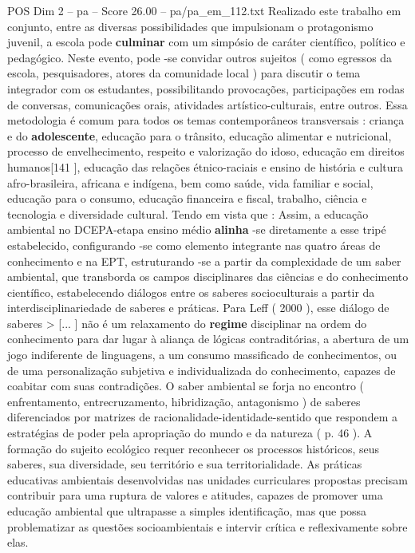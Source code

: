 \begin{textsample}{POS Dim 2 – pa – Score 26.00 – pa/pa\_em\_112.txt}  \label{ex:f2_pos_068}
Realizado este trabalho em conjunto, entre as diversas possibilidades que impulsionam o protagonismo juvenil, a escola pode \textbf{culminar} com um simpósio de caráter científico, político e pedagógico.
Neste evento, pode -se convidar outros sujeitos ( como egressos da escola, pesquisadores, atores da comunidade local ) para discutir o tema integrador com os estudantes, possibilitando provocações, participações em rodas de conversas, comunicações orais, atividades artístico-culturais, entre outros.
Essa metodologia é comum para todos os temas contemporâneos transversais : criança e do \textbf{adolescente}, educação para o trânsito, educação alimentar e nutricional, processo de envelhecimento, respeito e valorização do idoso, educação em direitos humanos[141 ], educação das relações étnico-raciais e ensino de história e cultura afro-brasileira, africana e indígena, bem como saúde, vida familiar e social, educação para o consumo, educação financeira e fiscal, trabalho, ciência e tecnologia e diversidade cultural.
Tendo em vista que : Assim, a educação ambiental no DCEPA-etapa ensino médio \textbf{alinha} -se diretamente a esse tripé estabelecido, configurando -se como elemento integrante nas quatro áreas de conhecimento e na EPT, estruturando -se a partir da complexidade de um saber ambiental, que transborda os campos disciplinares das ciências e do conhecimento científico, estabelecendo diálogos entre os saberes socioculturais a partir da interdisciplinariedade de saberes e práticas.
Para Leff ( 2000 ), esse diálogo de saberes > [... ] não é um relaxamento do \textbf{regime} disciplinar na ordem do conhecimento para dar lugar à aliança de lógicas contraditórias, a abertura de um jogo indiferente de linguagens, a um consumo massificado de conhecimentos, ou de uma personalização subjetiva e individualizada do conhecimento, capazes de coabitar com suas contradições.
O saber ambiental se forja no encontro ( enfrentamento, entrecruzamento, hibridização, antagonismo ) de saberes diferenciados por matrizes de racionalidade-identidade-sentido que respondem a estratégias de poder pela apropriação do mundo e da natureza ( p. 46 ).
A formação do sujeito ecológico requer reconhecer os processos históricos, seus saberes, sua diversidade, seu território e sua territorialidade.
As práticas educativas ambientais desenvolvidas nas unidades curriculares propostas precisam contribuir para uma ruptura de valores e atitudes, capazes de promover uma educação ambiental que ultrapasse a simples identificação, mas que possa problematizar as questões socioambientais e intervir crítica e reflexivamente sobre elas.

\end{textsample}
